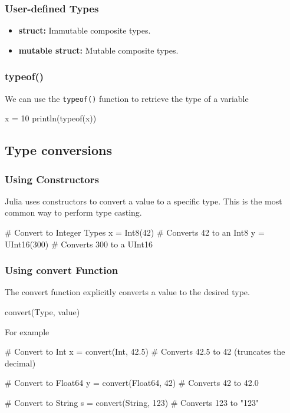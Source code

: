 \documentclass{report}
\begin{document}
    \bigbreak \noindent 
    \subsubsection{User-defined Types }
    \begin{itemize}
        \item \textbf{struct:} Immutable composite types.
        \item \textbf{mutable struct:} Mutable composite types.
    \end{itemize}

    \bigbreak \noindent 
    \subsubsection{typeof()}
    \bigbreak \noindent 
    We can use the \texttt{typeof()} function to retrieve the type of a variable
    \bigbreak \noindent 
    \begin{jlcode}
    x = 10
    println(typeof(x))
    \end{jlcode}
    \bigbreak \noindent 
    \subsection{Type conversions}
    \bigbreak \noindent 
    \subsubsection{Using Constructors}
    \bigbreak \noindent 
    Julia uses constructors to convert a value to a specific type. This is the most common way to perform type casting.
    \bigbreak \noindent 
    \begin{jlcode}
        # Convert to Integer Types
        x = Int8(42)       # Converts 42 to an Int8
        y = UInt16(300)    # Converts 300 to a UInt16
    \end{jlcode}

    \bigbreak \noindent 
    \subsubsection{Using convert Function}
    \bigbreak \noindent 
    The convert function explicitly converts a value to the desired type.
    \bigbreak \noindent 
    \begin{jlcode}
    convert(Type, value)
    \end{jlcode}
    \bigbreak \noindent 
    For example
    \bigbreak \noindent 
    \begin{jlcode}
        # Convert to Int
        x = convert(Int, 42.5)       # Converts 42.5 to 42 (truncates the decimal)

        # Convert to Float64
        y = convert(Float64, 42)     # Converts 42 to 42.0

        # Convert to String
        s = convert(String, 123)     # Converts 123 to "123"
    \end{jlcode}
\end{document}
